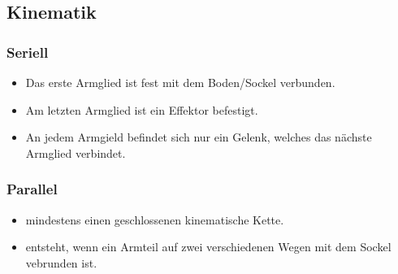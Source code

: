 \subsection{Kinematik}
\begin{minipage}{0.5\linewidth}
\subsubsection{Seriell}
\begin{itemize}
    \item Das erste Armglied ist fest mit dem Boden/Sockel verbunden.
    \item Am letzten Armglied ist ein Effektor befestigt.
    \item An jedem Armgield befindet sich nur ein Gelenk, welches das nächste Armglied verbindet.  
\end{itemize}
\end{minipage}
\begin{minipage}{0.5\linewidth}
\subsubsection{Parallel}
\begin{itemize}
    \item mindestens einen geschlossenen kinematische Kette.
    \item entsteht, wenn ein Armteil auf zwei verschiedenen Wegen mit dem Sockel vebrunden ist.
\end{itemize}
\end{minipage}